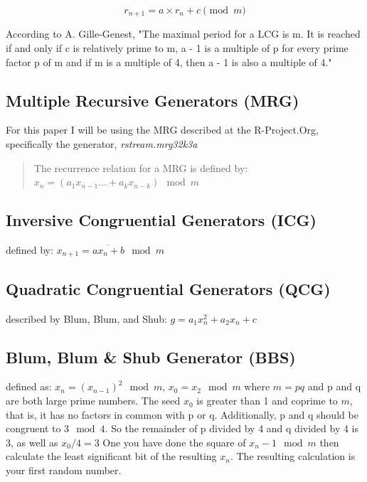 \documentclass[a4paper]{article}
\begin{document}
$$ r_{n + 1} = a \times r_n + c \pmod m $$

According to A. Gille-Genest, "The maximal period for a LCG is m. It is reached if and only if c is relatively prime to m, a - 1 is a multiple of p for every prime factor p of m and if m is a multiple of 4, then a - 1 is also a multiple of 4."\cite{Gille-Genest2014}

\subsection{Multiple Recursive Generators (MRG)}
For this paper I will be using the MRG described at the R-Project.Org\cite{Leydold2012}, specifically the generator, {\em rstream.mrg32k3a}

\begin{quote}The recurrence relation for a MRG is defined by:\\
	$x_n=(a_1 x_{n-1}\ldots +a_k x_{n-k}) \mod {m}$\cite{Gille-Genest2014}
\end{quote}

\subsection{Inversive Congruential Generators (ICG)}
defined by: $x_{n+1} = \overline{ax_n + b} \mod{m}$

\subsection{Quadratic Congruential Generators (QCG)}
described by Blum, Blum, and Shub: $g = a_1x_n^2+a_2x_n+c$

\subsection{Blum, Blum \& Shub Generator (BBS)}
defined as: $x_n=(x_{n-1})^{2} \mod {m}$, $x_0 = x_2 \mod {m}$ where ${m} = pq$ and p and q are both large prime numbers. The seed $x_0$ is greater than 1 and coprime to ${m}$, that is, it has no factors in common with p or q.
Additionally, p and q should be congruent to $3 \mod 4$. So the remainder of p divided by 4 and q divided by 4 is 3, as well as $x_0 / 4 = 3$
One you have done the square of $x_n-1 \mod {m}$ then calculate the least significant bit of the resulting $x_n$. The resulting calculation is your first random number.\cite{Menezes2010}
\end{document}
